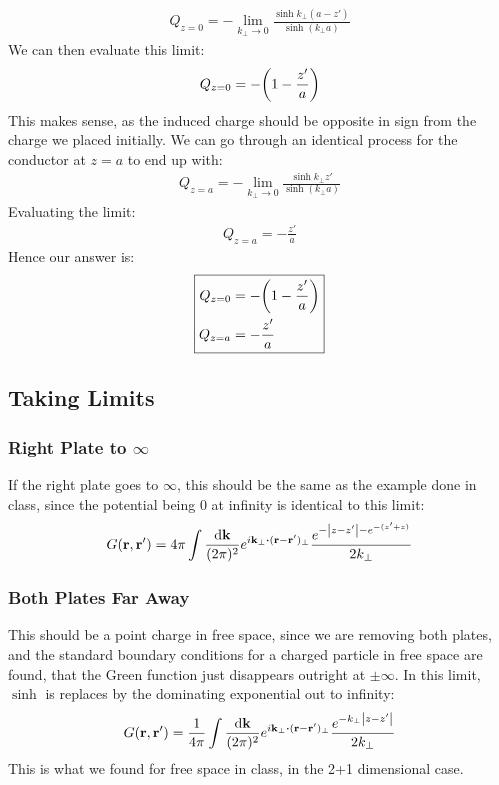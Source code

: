 \documentclass[12pt]{article}
\begin{document}
\begin{align*}
  Q_{z=0}=-\lim_{k_\perp\to0}\frac{\sinh k_\perp(a-z')}{\sinh(k_\perp a)}
\end{align*}
We can then evaluate this limit:
\begin{align*}
  Q_{z=0}=-\qty(1-\frac{z'}{a})
\end{align*}
This makes sense, as the induced charge should be opposite in sign from the charge we placed initially. We can go through an identical process for the conductor at $z=a$ to end up with:
\begin{align*}
  Q_{z=a}=-\lim_{k_\perp\to0}\frac{\sinh k_\perp z'}{\sinh(k_\perp a)}
\end{align*}
Evaluating the limit:
\begin{align*}
  Q_{z=a}=-\frac{z'}{a}
\end{align*}
Hence our answer is:
\begin{equation}
  \boxed{
  \begin{aligned}
    Q_{z=0}&=-\qty(1-\frac{z'}{a})\\
    Q_{z=a}&=-\frac{z'}{a}
  \end{aligned}
  }
\end{equation}
\subsection{Taking Limits}
\subsubsection{Right Plate to $\infty$}
If the right plate goes to $\infty$, this should be the same as the example done in class, since the potential being $0$ at infinity is identical to this limit:
\begin{align*}
  G(\vb{r,r}')=4\pi\int\frac{\dd{\vb{k}}}{(2\pi)^2}
  e^{i\vb{k}_\perp\vdot(\vb{r-r}')_\perp}\frac{e^{-\abs{z-z'}-e^{-(z'+z)}}}{2k_\perp}
\end{align*}
\subsubsection{Both Plates Far Away}
This should be a point charge in free space, since we are removing both plates, and the standard boundary conditions for a charged particle in free space are found, that the Green function just disappears outright at $\pm\infty$. In this limit, $\sinh$ is replaces by the dominating exponential out to infinity:
\begin{align*}
  G(\vb{r,r}')=\frac1{4\pi}\int\frac{\dd{\vb{k}}}{(2\pi)^2}
  e^{i\vb{k}_\perp\vdot(\vb{r-r}')_\perp}\frac{e^{-k_\perp\abs{z-z'}}}{2k_\perp}
\end{align*}
This is what we found for free space in class, in the 2+1 dimensional case. 
\end{document}
